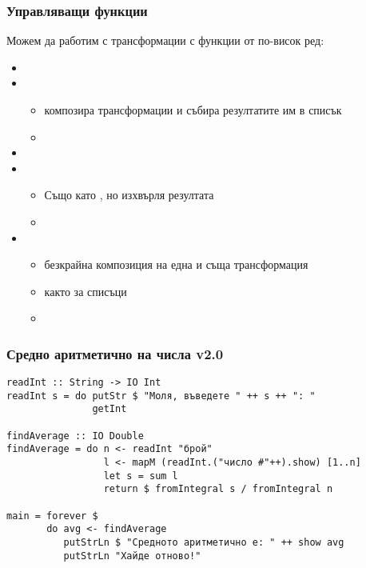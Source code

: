 \documentclass[alsotrans]{beamerswitch}
\begin{document}
\begin{frame}
  \frametitle{Управляващи функции}

  Можем да работим с трансформации с функции от по-висок ред:
  \begin{itemize}[<+->]
  \item {}
  \item {}
    \begin{itemize}
    \item композира трансформации и събира резултатите им в списък
    \item {} %
    \end{itemize}
  \item {}
  \item {}
    \begin{itemize}
    \item Също като , но изхвърля резултата
    \item {}
    \end{itemize}
  \item {}
    \begin{itemize}
    \item безкрайна композиция на една и съща трансформация
    \item както  за списъци
    \item {}
    \end{itemize}
  \end{itemize}
\end{frame}

\begin{frame}[fragile]
  \frametitle{Средно аритметично на числа v2.0}

  \small
\begin{lstlisting}
readInt :: String -> IO Int
readInt s = do putStr $ "Моля, въведете " ++ s ++ ": "
               getInt

findAverage :: IO Double
findAverage = do n <- readInt "брой"
                 l <- mapM (readInt.("число #"++).show) [1..n]
                 let s = sum l
                 return $ fromIntegral s / fromIntegral n

main = forever $
       do avg <- findAverage
          putStrLn $ "Средното аритметично е: " ++ show avg
          putStrLn "Хайде отново!"
\end{lstlisting}
\end{frame}
\end{document}
